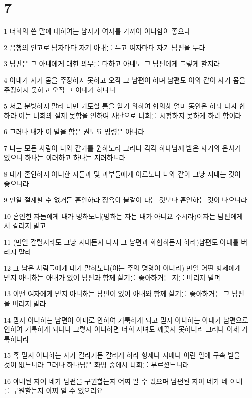 \chapter{7}

\par 1 너희의 쓴 말에 대하여는 남자가 여자를 가까이 아니함이 좋으나
\par 2 음행의 연고로 남자마다 자기 아내를 두고 여자마다 자기 남편을 두라
\par 3 남편은 그 아내에게 대한 의무를 다하고 아내도 그 남편에게 그렇게 할지라
\par 4 아내가 자기 몸을 주장하지 못하고 오직 그 남편이 하며 남편도 이와 같이 자기 몸을 주장하지 못하고 오직 그 아내가 하나니
\par 5 서로 분방하지 말라 다만 기도할 틈을 얻기 위하여 합의상 얼마 동안은 하되 다시 합하라 이는 너희의 절제 못함을 인하여 사단으로 너희를 시험하지 못하게 하려 함이라
\par 6 그러나 내가 이 말을 함은 권도요 명령은 아니라
\par 7 나는 모든 사람이 나와 같기를 원하노라 그러나 각각 하나님께 받은 자기의 은사가 있으니 하나는 이러하고 하나는 저러하니라
\par 8 내가 혼인하지 아니한 자들과 및 과부들에게 이르노니 나와 같이 그냥 지내는 것이 좋으니라
\par 9 만일 절제할 수 없거든 혼인하라 정욕이 불같이 타는 것보다 혼인하는 것이 나으니라
\par 10 혼인한 자들에게 내가 명하노니(명하는 자는 내가 아니요 주시라)여자는 남편에게서 갈리지 말고
\par 11 (만일 갈릴지라도 그냥 지내든지 다시 그 남편과 화합하든지 하라)남편도 아내를 버리지 말라
\par 12 그 남은 사람들에게 내가 말하노니(이는 주의 명령이 아니라) 만일 어떤 형제에게 믿지 아니하는 아내가 있어 남편과 함께 살기를 좋아하거든 저를 버리지 말며
\par 13 어떤 여자에게 믿지 아니하는 남편이 있어 아내와 함께 살기를 좋아하거든 그 남편을 버리지 말라
\par 14 믿지 아니하는 남편이 아내로 인하여 거룩하게 되고 믿지 아니하는 아내가 남편으로 인하여 거룩하게 되나니 그렇지 아니하면 너희 자녀도 깨끗지 못하니라 그러나 이제 거룩하니라
\par 15 혹 믿지 아니하는 자가 갈리거든 갈리게 하라 형제나 자매나 이런 일에 구속 받을 것이 없느니라 그러나 하나님은 화평 중에서 너희를 부르셨느니라
\par 16 아내된 자여 네가 남편을 구원할는지 어찌 알 수 있으며 남편된 자여 네가 네 아내를 구원할는지 어찌 알 수 있으리요
